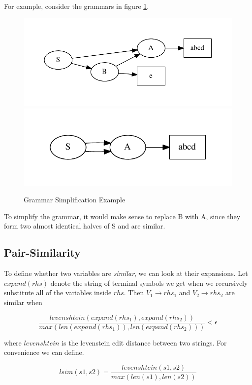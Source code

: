 \documentclass[11pt]{article}
\begin{document}
For example, consider the grammars in figure \ref{sred}.

\begin{figure}[t]
\centering
\includegraphics[scale=0.6]{include/sred1.pdf}
\includegraphics[scale=0.6]{include/sred2.pdf}
\caption{Grammar Simplification Example}
\label{sred}
\end{figure}

To simplify the grammar, it would make sense to replace B with A, since they
form two almost identical halves of S and are similar.

\subsection{Pair-Similarity}

To define whether two variables are \emph{similar}, we can look at their
expansions. Let $expand(rhs)$ denote the string of terminal symbols we get when
we recursively substitute all of the variables inside $rhs$. Then $V_1
\rightarrow rhs_1$ and $V_2 \rightarrow rhs_2$ are similar when

\[
  \frac{levenshtein(expand(rhs_1),expand(rhs_2))}
      {max(len(expand(rhs_1)),len(expand(rhs_2)))} < \epsilon
\]

where $levenshtein$ is the levenstein edit distance between two strings.  For
convenience we can define.

\[ lsim(s1,s2) = \frac{levenshtein(s1,s2)}{max(len(s1),len(s2))} \]
\end{document}
